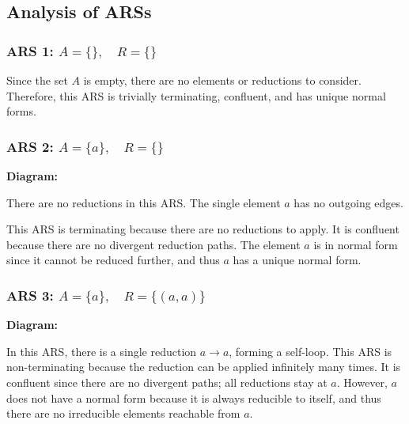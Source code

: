 \documentclass{article}
\theoremstyle{theorem}
\theoremstyle{definition}
\theoremstyle{remark}
\begin{document}
\subsection*{Analysis of ARSs}

\subsubsection*{ARS 1: \( A = \{\},\quad R = \{\} \)}

Since the set \( A \) is empty, there are no elements or reductions to consider. Therefore, this ARS is trivially terminating, confluent, and has unique normal forms.

\subsubsection*{ARS 2: \( A = \{a\},\quad R = \{\} \)}

\textbf{Diagram:}

\begin{center}
\end{center}

There are no reductions in this ARS. The single element \( a \) has no outgoing edges.

This ARS is terminating because there are no reductions to apply. It is confluent because there are no divergent reduction paths. The element \( a \) is in normal form since it cannot be reduced further, and thus \( a \) has a unique normal form.

\subsubsection*{ARS 3: \( A = \{a\},\quad R = \{(a, a)\} \)}

\textbf{Diagram:}

\begin{center}
\end{center}

In this ARS, there is a single reduction \( a \to a \), forming a self-loop. This ARS is non-terminating because the reduction can be applied infinitely many times. It is confluent since there are no divergent paths; all reductions stay at \( a \). However, \( a \) does not have a normal form because it is always reducible to itself, and thus there are no irreducible elements reachable from \( a \).
\end{document}
